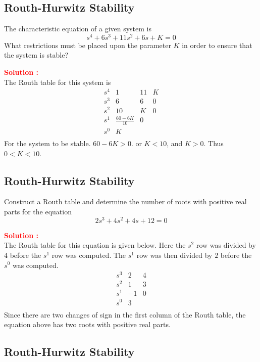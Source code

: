 \documentclass[12pt]{article}
\begin{document}
\subsection{Routh-Hurwitz Stability}

The characteristic equation of a given system is 
\begin{equation}
    s^4+6s^3+11s^2+6s+K = 0
\end{equation}
What restrictions must be placed upon the parameter \(K\) in order to ensure that the system is stable?

\textbf{\textcolor{red}{Solution :}} \\
The Routh table for this system is 
\[
\begin{array}{l|ccc}
s^4 & 1 & 11 & K \\
s^3 & 6 & 6 & 0 \\
s^2 & 10 & K & 0 \\
s^1 & \frac{60-6K}{10} & 0 & \\
s^0 & K & & \\
\end{array}
\]
For the system to be stable. \(60-6K>0\). or \(K<10\), and \(K>0\). Thus \(0<K<10\).

\clearpage
\subsection{Routh-Hurwitz Stability}

Construct a Routh table and determine the number of roots with positive real parts for the equation
\begin{equation}
    2s^3+4s^2+4s+12 = 0
\end{equation}

\textbf{\textcolor{red}{Solution :}} \\
The Routh table for this equation is given below. Here the \(s^2\) row was divided by \(4\) before the \(s^1\) row was computed. The \(s^1\) row was then divided by \(2\) before the \(s^0\) was computed.
\[
\begin{array}{l|cc}
s^3 & 2 & 4  \\
s^2 & 1 & 3 \\
s^1 & -1 & 0  \\
s^0 & 3 &  \\
\end{array}
\]
Since there are two changes of sign in the first column of the Routh table, the equation above has two roots with positive real parts.

\clearpage
\subsection{Routh-Hurwitz Stability}
\end{document}
